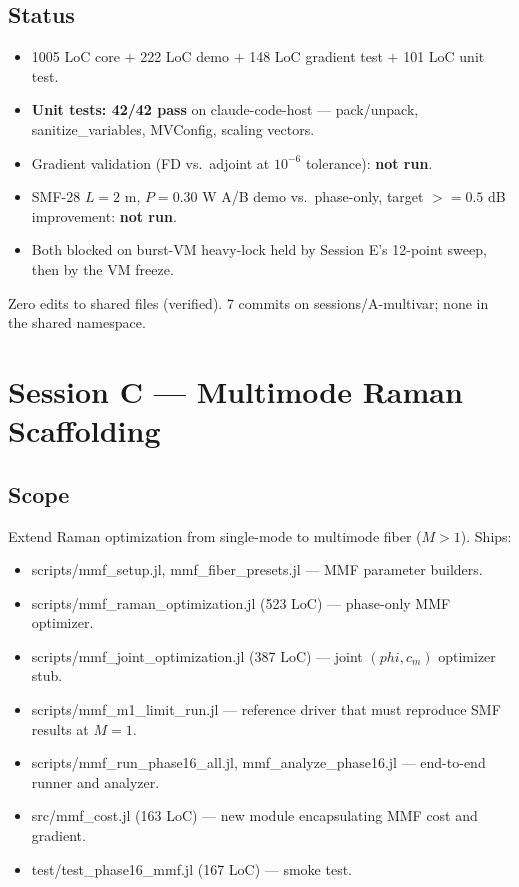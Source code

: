 \documentclass[11pt,letterpaper]{article}
\def\varphi{phi}%
\def\geq{>=}%
\def\texttt#1{#1}%
\begin{document}
\subsection{Status}

\begin{itemize}[leftmargin=*]
  \item 1005 LoC core $+$ 222 LoC demo $+$ 148 LoC gradient test $+$ 101 LoC unit test.
  \item \textbf{Unit tests: 42/42 pass} on \texttt{claude-code-host} --- pack/unpack, \texttt{sanitize\_variables}, \texttt{MVConfig}, scaling vectors.
  \item Gradient validation (FD vs.\ adjoint at $10^{-6}$ tolerance): \textbf{not run}.
  \item SMF-28 $L=2$ m, $P=0.30$ W A/B demo vs.\ phase-only, target $\geq 0.5$ dB improvement: \textbf{not run}.
  \item Both blocked on burst-VM heavy-lock held by Session E's 12-point sweep, then by the VM freeze.
\end{itemize}

Zero edits to shared files (verified). 7 commits on \texttt{sessions/A-multivar}; none in the shared namespace.

\newpage
\section{Session C --- Multimode Raman Scaffolding}
\label{sec:sessionC}

\subsection{Scope}

Extend Raman optimization from single-mode to multimode fiber ($M > 1$). Ships:
\begin{itemize}[leftmargin=*]
  \item \texttt{scripts/mmf\_setup.jl}, \texttt{mmf\_fiber\_presets.jl} --- MMF parameter builders.
  \item \texttt{scripts/mmf\_raman\_optimization.jl} (523 LoC) --- phase-only MMF optimizer.
  \item \texttt{scripts/mmf\_joint\_optimization.jl} (387 LoC) --- joint $(\varphi, c_m)$ optimizer stub.
  \item \texttt{scripts/mmf\_m1\_limit\_run.jl} --- reference driver that must reproduce SMF results at $M=1$.
  \item \texttt{scripts/mmf\_run\_phase16\_all.jl}, \texttt{mmf\_analyze\_phase16.jl} --- end-to-end runner and analyzer.
  \item \texttt{src/mmf\_cost.jl} (163 LoC) --- new module encapsulating MMF cost and gradient.
  \item \texttt{test/test\_phase16\_mmf.jl} (167 LoC) --- smoke test.
\end{itemize}
\end{document}

